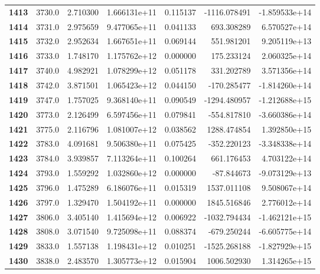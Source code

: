 \documentclass{report}[12pt]
\begin{document}
\begin{center}
\begin{tabular}{lrrrrrr}
\textbf{1413} &         3730.0 &   2.710300 &  1.666131e+11 &    0.115137 & -1116.078491 & -1.859533e+14 \\
\textbf{1414} &         3731.0 &   2.975659 &  9.477065e+11 &    0.041133 &   693.308289 &  6.570527e+14 \\
\textbf{1415} &         3732.0 &   2.952634 &  1.667651e+11 &    0.069144 &   551.981201 &  9.205119e+13 \\
\textbf{1416} &         3733.0 &   1.748170 &  1.175762e+12 &    0.000000 &   175.233124 &  2.060325e+14 \\
\textbf{1417} &         3740.0 &   4.982921 &  1.078299e+12 &    0.051178 &   331.202789 &  3.571356e+14 \\
\textbf{1418} &         3742.0 &   3.871501 &  1.065423e+12 &    0.044150 &  -170.285477 & -1.814260e+14 \\
\textbf{1419} &         3747.0 &   1.757025 &  9.368140e+11 &    0.090549 & -1294.480957 & -1.212688e+15 \\
\textbf{1420} &         3773.0 &   2.126499 &  6.597456e+11 &    0.079841 &  -554.817810 & -3.660386e+14 \\
\textbf{1421} &         3775.0 &   2.116796 &  1.081007e+12 &    0.038562 &  1288.474854 &  1.392850e+15 \\
\textbf{1422} &         3783.0 &   4.091681 &  9.506380e+11 &    0.075425 &  -352.220123 & -3.348338e+14 \\
\textbf{1423} &         3784.0 &   3.939857 &  7.113264e+11 &    0.100264 &   661.176453 &  4.703122e+14 \\
\textbf{1424} &         3793.0 &   1.559292 &  1.032860e+12 &    0.000000 &   -87.844673 & -9.073129e+13 \\
\textbf{1425} &         3796.0 &   1.475289 &  6.186076e+11 &    0.015319 &  1537.011108 &  9.508067e+14 \\
\textbf{1426} &         3797.0 &   1.329470 &  1.504192e+11 &    0.000000 &  1845.516846 &  2.776012e+14 \\
\textbf{1427} &         3806.0 &   3.405140 &  1.415694e+12 &    0.006922 & -1032.794434 & -1.462121e+15 \\
\textbf{1428} &         3808.0 &   3.071540 &  9.725098e+11 &    0.088374 &  -679.250244 & -6.605775e+14 \\
\textbf{1429} &         3833.0 &   1.557138 &  1.198431e+12 &    0.010251 & -1525.268188 & -1.827929e+15 \\
\textbf{1430} &         3838.0 &   2.483570 &  1.305773e+12 &    0.015904 &  1006.502930 &  1.314265e+15 \\

\end{tabular}
\end{center}
\end{document}

